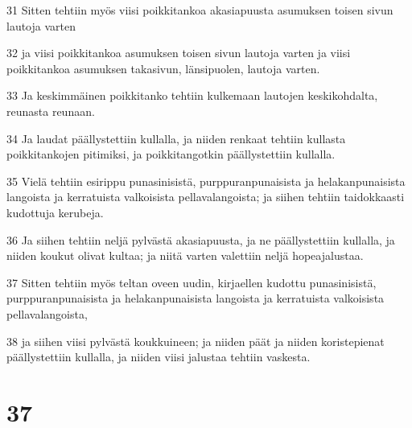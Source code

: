 \par 31 Sitten tehtiin myös viisi poikkitankoa akasiapuusta asumuksen toisen sivun lautoja varten
\par 32 ja viisi poikkitankoa asumuksen toisen sivun lautoja varten ja viisi poikkitankoa asumuksen takasivun, länsipuolen, lautoja varten.
\par 33 Ja keskimmäinen poikkitanko tehtiin kulkemaan lautojen keskikohdalta, reunasta reunaan.
\par 34 Ja laudat päällystettiin kullalla, ja niiden renkaat tehtiin kullasta poikkitankojen pitimiksi, ja poikkitangotkin päällystettiin kullalla.
\par 35 Vielä tehtiin esirippu punasinisistä, purppuranpunaisista ja helakanpunaisista langoista ja kerratuista valkoisista pellavalangoista; ja siihen tehtiin taidokkaasti kudottuja kerubeja.
\par 36 Ja siihen tehtiin neljä pylvästä akasiapuusta, ja ne päällystettiin kullalla, ja niiden koukut olivat kultaa; ja niitä varten valettiin neljä hopeajalustaa.
\par 37 Sitten tehtiin myös teltan oveen uudin, kirjaellen kudottu punasinisistä, purppuranpunaisista ja helakanpunaisista langoista ja kerratuista valkoisista pellavalangoista,
\par 38 ja siihen viisi pylvästä koukkuineen; ja niiden päät ja niiden koristepienat päällystettiin kullalla, ja niiden viisi jalustaa tehtiin vaskesta.

\chapter{37}

